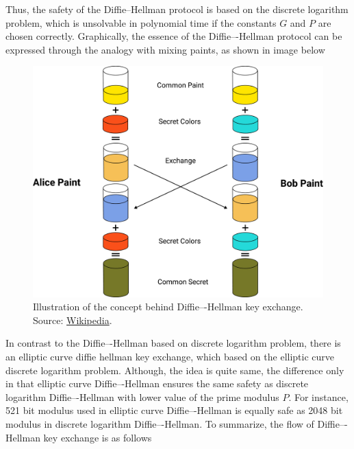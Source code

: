 Thus, the safety of the Diffie--Hellman protocol is based on the discrete logarithm problem, which is unsolvable
in polynomial time if the constants $G$ and $P$ are chosen correctly.
Graphically, the essence of the Diffie–-Hellman protocol can be expressed through the analogy with mixing paints,
as shown in image below
\begin{figure}[H]
    \centering
    \includegraphics[width=1\textwidth]{Pictures/Diffie-Hellman}
    \caption{Illustration of the concept behind Diffie–-Hellman key exchange.
    Source: \href{https://en.wikipedia.org/wiki/Diffie-Hellman_key_exchange}{Wikipedia}.}\label{fig:figure4}
\end{figure}
In contrast to the Diffie–-Hellman based on discrete logarithm problem, there is an elliptic curve diffie hellman
key exchange, which based on the elliptic curve discrete logarithm problem.
Although, the idea is quite same, the difference only in that elliptic curve Diffie–-Hellman ensures the same safety
as discrete logarithm Diffie–-Hellman with lower value of the prime modulus $P$.
For instance, 521 bit modulus used in elliptic curve Diffie–-Hellman is equally safe as 2048 bit modulus in
discrete logarithm Diffie–-Hellman.
To summarize, the flow of Diffie–-Hellman key exchange is as follows

